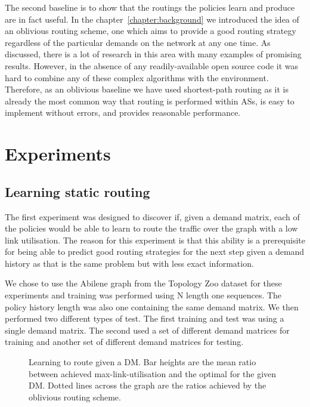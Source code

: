 The second baseline is to show that the routings the policies learn and produce are in fact useful. In the chapter~\ref{chapter:background} we introduced the idea of an oblivious routing scheme, one which aims to provide a good routing strategy regardless of the particular demands on the network at any one time. As discussed, there is a lot of research in this area with many examples of promising results. However, in the absence of any readily-available open source code it was hard to combine any of these complex algorithms with the environment. Therefore, as an oblivious baseline we have used shortest-path routing as it is already the most common way that routing is performed within ASs, is easy to implement without errors, and provides reasonable performance.

\section{Experiments}

\subsection{Learning static routing}
\label{section:exp_static}
The first experiment was designed to discover if, given a demand matrix, each of the policies would be able to learn to route the traffic over the graph with a low link utilisation. The reason for this experiment is that this ability is a prerequisite for being able to predict good routing strategies for the next step given a demand history as that is the same problem but with less exact information.

We chose to use the Abilene graph from the Topology Zoo dataset for these experiments and training was performed using N length one sequences. The policy history length was also one containing the same demand matrix. We then performed two different types of test. The first training and test was using a single demand matrix. The second used a set of different demand matrices for training and another set of different demand matrices for testing.

\begin{figure}
    \centering
    
    \caption{Learning to route given a DM. Bar heights are the mean ratio between achieved max-link-utilisation and the optimal for the given DM. Dotted lines across the graph are the ratios achieved by the oblivious routing scheme.}
    \label{fig:exp_static}
\end{figure}

